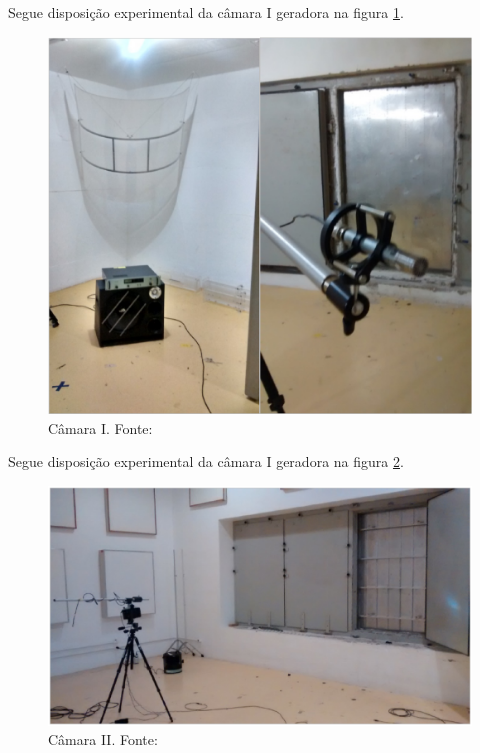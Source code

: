 \newpage
Segue disposição experimental da câmara I geradora na figura \ref{experimento_4}.
\begin{figure}[h]
	\centering
	\includegraphics[scale=0.35]{imagem_2.eps}
	\caption{Câmara I. Fonte: \cite{silva2009simulaccao}}
	\label{experimento_4}
\end{figure}

Segue disposição experimental da câmara I geradora na figura \ref{experimento_5}.
\begin{figure}[h]
	\centering
	\includegraphics[scale=0.35]{imagem_1.eps}
	\caption{Câmara II. Fonte: \cite{silva2009simulaccao}}
	\label{experimento_5}
\end{figure}


